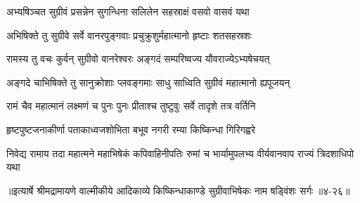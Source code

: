 \twolineshloka
{अभ्यषिञ्चत सुग्रीवं प्रसन्नेन सुगन्धिना}
{सलिलेन सहस्राक्षं वसवो वासवं यथा} %

\twolineshloka
{अभिषिक्ते तु सुग्रीवे सर्वे वानरपुङ्गवाः}
{प्रचुक्रुशुर्महात्मानो हृष्टाः शतसहस्रशः} %

\twolineshloka
{रामस्य तु वचः कुर्वन् सुग्रीवो वानरेश्वरः}
{अङ्गदं सम्परिष्वज्य यौवराज्येऽभ्यषेचयत्} %

\twolineshloka
{अङ्गदे चाभिषिक्ते तु सानुक्रोशाः प्लवङ्गमाः}
{साधु साध्विति सुग्रीवं महात्मानो ह्यपूजयन्} %

\twolineshloka
{रामं चैव महात्मानं लक्ष्मणं च पुनः पुनः}
{प्रीताश्च तुष्टुवुः सर्वे तादृशे तत्र वर्तिनि} %

\twolineshloka
{हृष्टपुष्टजनाकीर्णा पताकाध्वजशोभिता}
{बभूव नगरी रम्या किष्किन्धा गिरिगह्वरे} %

\twolineshloka
{निवेद्य रामाय तदा महात्मने महाभिषेकं कपिवाहिनीपतिः}
{रुमां च भार्यामुपलभ्य वीर्यवानवाप राज्यं त्रिदशाधिपो यथा} %


॥इत्यार्षे श्रीमद्रामायणे वाल्मीकीये आदिकाव्ये किष्किन्धाकाण्डे सुग्रीवाभिषेकः नाम षड्विंशः सर्गः ॥४-२६॥
